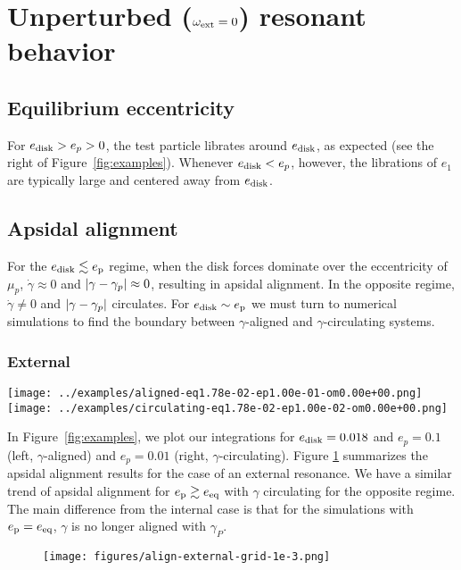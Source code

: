 \documentclass{article}
\newcommand{\edisk}{e_{\rm disk}}
\newcommand{\omext}{\omega_{\rm ext}}
\newcommand{\ep}{e_{\rm p}}
\DeclarePairedDelimiter{\abs}{|}{|}
\begin{document}
\section{Unperturbed ($\omext=0$) resonant behavior}
\subsection{Equilibrium eccentricity}
For $e_{\rm disk} > e_p >0$, the test particle librates around
$e_{\rm disk}$, as expected (see the right of
Figure~\ref{fig:examples}).
Whenever $\edisk<e_p$, however, the librations of $e_1$ are typically large
and centered away from $\edisk$.
\subsection{Apsidal alignment}
For the $\edisk\lesssim \ep$ regime, when the disk forces dominate over the eccentricity of $\mu_p$,
$\dot{\gamma}\approx 0$ and $\abs{\gamma-\gamma_p}\approx 0$, resulting in
apsidal alignment. In the opposite regime, $\dot{\gamma}\neq 0$ and
$\abs{\gamma - \gamma_p}$ circulates.
For $\edisk \sim \ep$ we must turn to numerical
simulations to find the boundary between $\gamma$-aligned and $\gamma$-circulating systems.

\subsubsection{External}

\begin{figure*}[htb]
  \centering
 \texttt{[image: ../examples/aligned-eq1.78e-02-ep1.00e-01-om0.00e+00.png]}
 \texttt{[image: ../examples/circulating-eq1.78e-02-ep1.00e-02-om0.00e+00.png]}
  \caption{ }
  \label{fig:examples}
\end{figure*}

In Figure~\ref{fig:examples}, we plot our integrations for
$\edisk = 0.018$ and $e_p = 0.1$ (left, $\gamma$-aligned) and
$e_p = 0.01$ (right, $\gamma$-circulating).  
Figure \ref{fig:align-external} summarizes the apsidal alignment
results for the case of an external resonance.  We have a similar
trend of apsidal alignment for $\ep \gtrsim e_{\rm eq}$ with $\gamma$
circulating for the opposite regime. The main difference from the
internal case is that for the simulations with $\ep = e_{\rm eq}$,
$\gamma$ is no longer aligned with $\gamma_P$.
\begin{figure}[htb]
  \centering
  \texttt{[image: figures/align-external-grid-1e-3.png]}
  \caption{ }
  \label{fig:align-external}
\end{figure}
\end{document}
